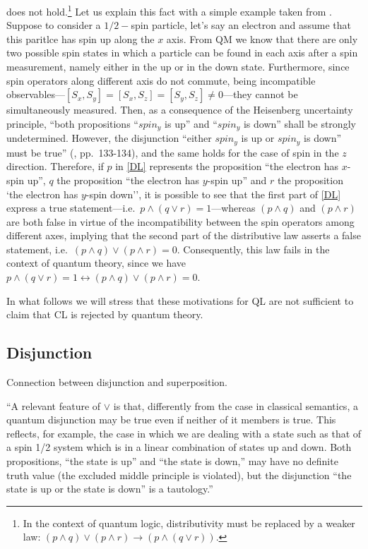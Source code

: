 \documentclass[11pt, executivepaper]{article}
\begin{document}
\noindent does not hold.\footnote{In the context of quantum logic, distributivity must be replaced by a weaker law: $(p\wedge q)\vee(p\wedge r)\longrightarrow(p\wedge(q\vee r)).$}
Let us explain this fact with a simple example taken from \cite{Giuntini:2002}. Suppose to consider a $1/2-$spin particle, let's say an electron and assume that this paritlce has spin up along the $x$ axis. From QM we know that there are only two possible spin states in which a particle can be found in each axis after a spin measurement, namely either in the up or in the down state. Furthermore, since spin operators along different axis do not commute, being incompatible observables---$[S_x, S_y]=[S_x, S_z]=[S_y, S_z]\neq0$---they cannot be simultaneously measured. Then, as a consequence of the Heisenberg uncertainty principle, ``both propositions ``$spin_y$ is up'' and ``$spin_y$ is down'' shall be strongly undetermined. However, the disjunction ``either $spin_y$ is up or $spin_y$ is down'' must be true'' (\cite{Giuntini:2002}, pp.\ 133-134), and the same holds for the case of spin in the $z$ direction. Therefore, if $p$ in \eqref{DL} represents the proposition ``the electron has $x$-spin up'', $q$ the proposition ``the electron has $y$-spin up'' and $r$  the proposition `the electron has $y$-spin down'', it is possible to see that the first part of \eqref{DL} express a true statement---i.e.\ $p\wedge(q\vee r)=1$---whereas $(p\wedge q)$ and $(p\wedge r)$ are both false in virtue of the incompatibility between the spin operators among different axes, implying that the second part of the distributive law asserts a false statement, i.e.\ $(p\wedge q)\vee(p\wedge r)=0$. Consequently, this law fails in the context of quantum theory, since we have $p\wedge(q\vee r)=1\longleftrightarrow(p\wedge q)\vee(p\wedge r)=0$. 
\vspace{2mm}

In what follows we will stress that these motivations for QL are not sufficient to claim that CL is rejected by quantum theory.

\subsection{Disjunction}

Connection between disjunction and superposition.

``A relevant feature of $\vee$ is that, differently from the case in classical semantics, a quantum disjunction may be true even if neither of it members is true. This reflects, for example, the case in which we are dealing with a state such as that of a spin 1/2 system which is in a linear combination of states up and down. Both propositions, ``the state is up'' and ``the state is down,'' may have no definite truth value (the excluded middle principle is violated), but the disjunction ``the state is up or the state is down'' is a tautology.''
\end{document}
